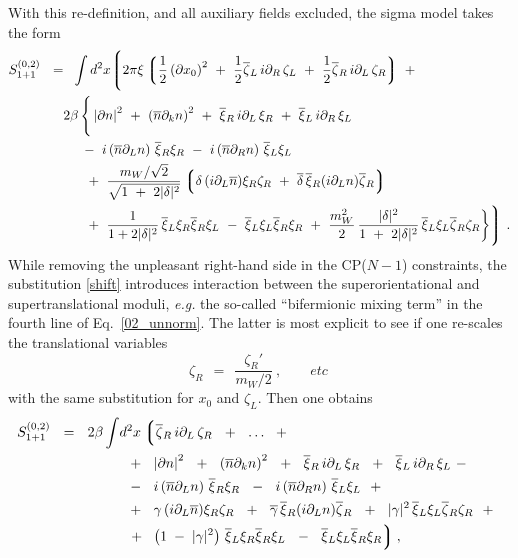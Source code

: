 \documentclass[12pt]{article}
\newcommand{\p}{\partial}
\newcommand{\ov}{\overline}
\newcommand{\lgr}{\left\lgroup}
\newcommand{\rgr}{\right\rgroup}
\newcommand{\bxir}{\ov{\xi}{}_R}
\newcommand{\bxil}{\ov{\xi}{}_L}
\newcommand{\xir}{\xi_R}
\newcommand{\xil}{\xi_L}
\newcommand{\bzl}{\ov{\zeta}{}_L}
\newcommand{\bzr}{\ov{\zeta}{}_R}
\newcommand{\zr}{\zeta_R}
\newcommand{\zl}{\zeta_L}
\newcommand{\nbar}{\ov{n}}
\begin{document}
	With this re-definition, and all auxiliary fields excluded, the sigma model takes the form
\begin{align}
%
\notag
S_{1+1}^{(0,2)} ~~=&~~
	\int d^2 x 
\Biggl\lgroup
	2\pi\xi \lgr \frac 1 2 \left (\p x_0\right)^2 ~+~
		      \frac 1 2 \bzl\, i\p_R\, \zl ~+~
			\frac 1 2 \bzr\, i\p_L\, \zr
		\rgr
	~+~ \\
%
\label{02_unnorm}
&
	2\beta\, \Bigg\{
	\left|\p n\right|^2 ~+~ \left(\ov{n}\p_k n\right)^2 ~+~
	\bxir \, i\p_L \, \xir  ~+~ \bxil \, i\p_R \, \xil \\
%
\notag
&
	~~~~
	-~
	i \left(\ov{n}\p_L n\right)\, \bxir \xir ~-~ 
	i \left(\ov{n}\p_R n\right)\, \bxil \xil 
	\\
%
\notag
&
	~~~~
	~+~
	\frac{m_W/\sqrt{2}} { \sqrt{ 1~+~2|\delta|^2 } }
	\lgr \delta\, (i\p_L \ov{n}) \xir\zr ~+~ 
             \ov{\delta}\, \bxir (i\p_L n)\bzr 
	\rgr \\
%
\notag
&
	~~~~
	~+~ \frac{1}{1 + 2|\delta|^2}\, \bxil\xir \bxir\xil 
	~-~ \bxil\xil\bxir\xir
	~+~
	\frac{m_W^2}{2}\,\frac{|\delta|^2}{1 ~+~ 2|\delta|^2}\,
		\bxil\xil\bzr\zr \bigg\} 
\Biggr\rgroup~.
\end{align}
	While removing the unpleasant right-hand side in the CP($N-1$) constraints, the
	substitution \eqref{shift} introduces interaction between the superorientational
	and supertranslational moduli, {\it e.g.} the so-called ``bifermionic mixing term''
	in the fourth line of Eq.~\eqref{02_unnorm}.
	The latter is most explicit to see if one re-scales the translational variables
\[
	\zr ~~=~~ \frac {\zr'}  {{m_W}/{2}}~, \qquad etc~
\]
	with the same substitution for $ x_0 $ and $ \zl $.
	Then one obtains 
\begin{align}
%
\notag
S_{1+1}^{(0,2)} ~~=~~ 2\beta
	\int & d^2 x 
\lgr
	\bzr\, i\p_L\, \zr ~~+~~ \dots ~~+~~
\right.
	\\
%
\label{world02}
	&
	\;\;
	+~~
	\left|\p n\right|^2 ~~+~~ \left(\ov{n}\p_k n\right)^2 ~~+~~
	\bxir \, i\p_L \, \xir  ~~+~~ \bxil \, i\p_R \, \xil 
	~-~
	\\
%
\notag
	&
	\;\;
	-~~
	i \left(\ov{n}\p_L n\right)\, \bxir \xir ~~-~~ 
	i \left(\ov{n}\p_R n\right)\, \bxil \xil ~~+~~
	\\
%
\notag
	&
	\;\;
	+~~
	\gamma\, (i\p_L\nbar) \xir\zr ~~+~~ \ov{\gamma}\, \bxir (i\p_L n) \bzr ~~+~~
	|\gamma|^2\, \bxil\xil \bzr\zr ~~+~~
	\\
%
\notag
	&
	\;\;
\left.
	+~~ 
	\left( 1 \;-\; |\gamma|^2 \right)\, \bxil\xir \bxir\xil  
	~~-~~ \bxil\xil \bxir\xir
\rgr ,
\end{align}
\end{document}
